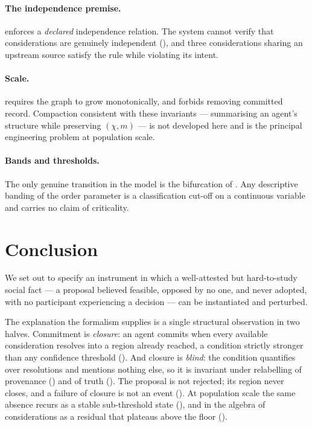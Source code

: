 \documentclass[11pt,a4paper]{article}
\theoremstyle{clstyle}
\theoremstyle{definition}
\theoremstyle{remark}
\newcommand{\Char}{\chi}
\newcommand{\rec}{m}
\begin{document}
\paragraph{The independence premise.}  enforces a
\emph{declared} independence relation. The system cannot verify that
considerations are genuinely independent (), and three
considerations sharing an upstream source satisfy the rule while violating
its intent.

\paragraph{Scale.}  requires the graph to grow
monotonically, and  forbids removing committed record.
Compaction consistent with these invariants --- summarising an agent's
structure while preserving $(\Char,\rec)$ --- is not developed here and is
the principal engineering problem at population scale.

\paragraph{Bands and thresholds.} The only genuine transition in the model is
the bifurcation of . Any descriptive banding of the order
parameter is a classification cut-off on a continuous variable and carries no
claim of criticality.

\section{Conclusion}
\label{sec:conclusion}

We set out to specify an instrument in which a well-attested but
hard-to-study social fact --- a proposal believed feasible, opposed by no
one, and never adopted, with no participant experiencing a decision --- can
be instantiated and perturbed.

The explanation the formalism supplies is a single structural observation in
two halves. Commitment is \emph{closure}: an agent commits when every
available consideration resolves into a region already reached, a condition
strictly stronger than any confidence threshold
(). And closure is \emph{blind}: the condition
quantifies over resolutions and mentions nothing else, so it is invariant
under relabelling of provenance () and of truth
(). The proposal is not rejected; its region never
closes, and a failure of closure is not an event
(). At population scale the same absence recurs as a
stable sub-threshold state (), and in the algebra of
considerations as a residual that plateaus above the floor
().
\end{document}
